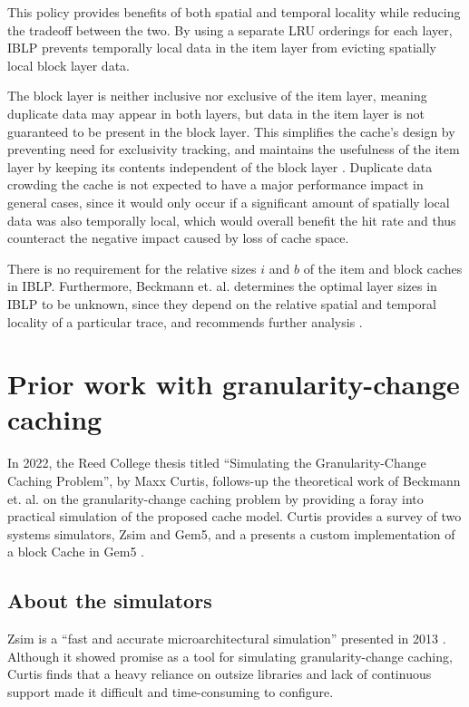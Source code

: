 \documentclass[12pt,twoside]{reedthesis}
\begin{document}
	This policy provides benefits of both spatial and temporal locality while reducing the tradeoff between the two. By using a separate LRU orderings for each layer, IBLP prevents temporally local data in the item layer from evicting spatially local block layer data.
	
	The block layer is neither inclusive nor exclusive of the item layer, meaning duplicate data may appear in both layers, but data in the item layer is not guaranteed to be present in the block layer. This simplifies the cache's design by preventing need for exclusivity tracking, and maintains the usefulness of the item layer by keeping its contents independent of the block layer \cite{beckmann}. Duplicate data crowding the cache is not expected to have a major performance impact in general cases, since it would only occur if a significant amount of spatially local data was also temporally local, which would overall benefit the hit rate and thus counteract the negative impact caused by loss of cache space.
	
	There is no requirement for the relative sizes $i$ and $b$ of the item and block caches in IBLP. Furthermore, Beckmann et. al. determines the optimal layer sizes in IBLP to be unknown, since they depend on the relative spatial and temporal locality of a particular trace, and recommends further analysis \cite{beckmann}.

\section{Prior work with granularity-change caching}

In 2022, the Reed College thesis titled ``Simulating the Granularity-Change Caching Problem'', by Maxx Curtis, follows-up the theoretical work of Beckmann et. al. on the granularity-change caching problem by providing a foray into practical simulation of the proposed cache model. Curtis provides a survey of two systems simulators, Zsim and Gem5, and a presents a custom implementation of a block Cache in Gem5 \cite{curtis}.

	\subsection*{About the simulators}

	Zsim is a ``fast and accurate microarchitectural simulation'' presented in 2013 \cite{zsim}. Although it showed promise as a tool for simulating granularity-change caching, Curtis finds that a heavy reliance on outsize libraries and lack of continuous support made it difficult and time-consuming to configure.
\end{document}
